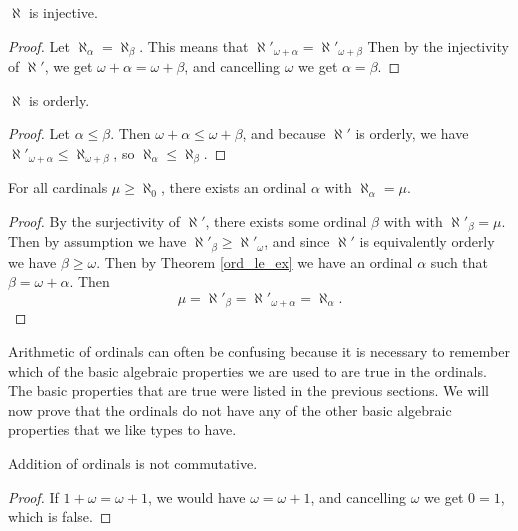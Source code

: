 \documentclass[../../math.tex]{subfiles}
\begin{document}
\begin{instance}
    $\aleph$ is injective.
\end{instance}
\begin{proof}
    Let $\aleph_\alpha = \aleph_\beta$.  This means that $\aleph'_{\omega +
    \alpha} = \aleph'_{\omega + \beta}$  Then by the injectivity of $\aleph'$,
    we get $\omega + \alpha = \omega + \beta$, and cancelling $\omega$ we get
    $\alpha = \beta$.
\end{proof}

\begin{instance}
    $\aleph$ is orderly.
\end{instance}
\begin{proof}
    Let $\alpha \leq \beta$.  Then $\omega + \alpha \leq \omega + \beta$, and
    because $\aleph'$ is orderly, we have $\aleph'_{\omega + \alpha} \leq
    \aleph_{\omega + \beta}$, so $\aleph_\alpha \leq \aleph_\beta$.
\end{proof}

\begin{theorem} \label{aleph_sur}
    For all cardinals $\mu \geq \aleph_0$, there exists an ordinal $\alpha$ with
    $\aleph_\alpha = \mu$.
\end{theorem}
\begin{proof}
    By the surjectivity of $\aleph'$, there exists some ordinal $\beta$ with
    with $\aleph'_\beta = \mu$.  Then by assumption we have $\aleph'_\beta \geq
    \aleph'_\omega$, and since $\aleph'$ is equivalently orderly we have $\beta
    \geq \omega$.  Then by Theorem \ref{ord_le_ex} we have an ordinal $\alpha$
    such that $\beta = \omega + \alpha$.  Then
    \[
        \mu = \aleph'_\beta = \aleph'_{\omega + \alpha} = \aleph_\alpha.
    \]
\end{proof}

Arithmetic of ordinals can often be confusing because it is necessary to
remember which of the basic algebraic properties we are used to are true in the
ordinals.  The basic properties that are true were listed in the previous
sections.  We will now prove that the ordinals do not have any of the other
basic algebraic properties that we like types to have.

\begin{theorem}
    Addition of ordinals is not commutative.
\end{theorem}
\begin{proof}
    If $1 + \omega = \omega + 1$, we would have $\omega = \omega + 1$, and
    cancelling $\omega$ we get $0 = 1$, which is false.
\end{proof}
\end{document}

